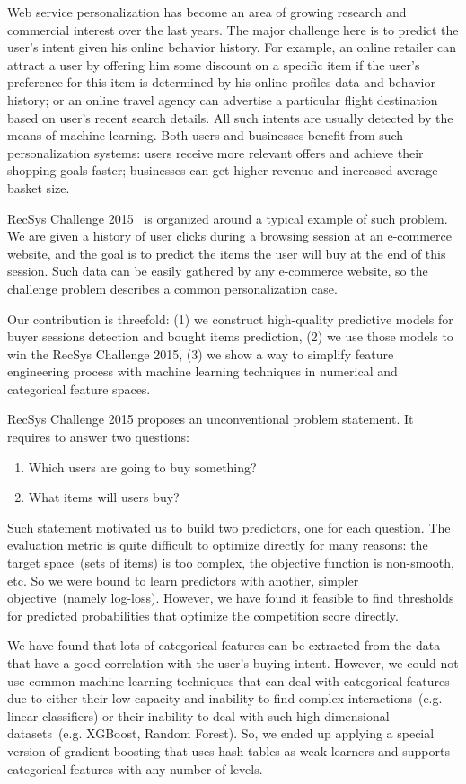 \documentclass{sig-alternate}
\begin{document}
Web service personalization has become an area of growing research and commercial interest over the last years.
The major challenge here is to predict the user's intent given his online behavior history.
For example, an online retailer can attract a user by offering him some discount
on a specific item if the user's preference for this item is determined by his online profiles data and behavior history;
or an online travel agency can advertise a particular flight destination based on user's recent search details.
All such intents are usually detected by the means of machine learning.
Both users and businesses benefit from such personalization systems:
users receive more relevant offers and achieve their shopping goals faster;
businesses can get higher revenue and increased average basket size.

RecSys Challenge 2015~\cite{benshimon15recsys} is organized around a typical example of such problem.
We are given a history of user clicks during a browsing session at an e-commerce website,
and the goal is to predict the items the user will buy at the end
of this session.
Such data can be easily gathered by any e-commerce website,
so the challenge problem describes a common personalization case.

Our contribution is threefold:
(1) we construct high-quality predictive models for buyer sessions detection
and bought items prediction,
(2) we use those models to win the RecSys Challenge 2015,
(3) we show a way to simplify feature engineering process
with machine learning techniques in numerical and categorical feature spaces.

RecSys Challenge 2015 proposes an unconventional problem statement.
It requires to answer two questions:
\begin{enumerate}
    \item Which users are going to buy something?
    \item What items will users buy?
\end{enumerate}
Such statement motivated us to build two predictors,
one for each question.
The evaluation metric is quite difficult to optimize directly
for many reasons: the target space~(sets of items) is too complex,
the objective function is non-smooth, etc.
So we were bound to learn predictors with another, simpler objective~(namely log-loss).
However, we have found it feasible to find thresholds for predicted
probabilities that optimize the competition score directly.

We have found that lots of categorical features
can be extracted from the data that have
a good correlation with the user's buying intent.
However, we could not use common machine learning techniques
that can deal with categorical features
due to either their low capacity and inability to find
complex interactions~(e.g. linear classifiers)
or their inability to deal with such high-dimensional datasets~(e.g. XGBoost, Random Forest).
So, we ended up applying a special version of gradient boosting
that uses hash tables as weak learners and supports
categorical features with any number of levels.
\end{document}
